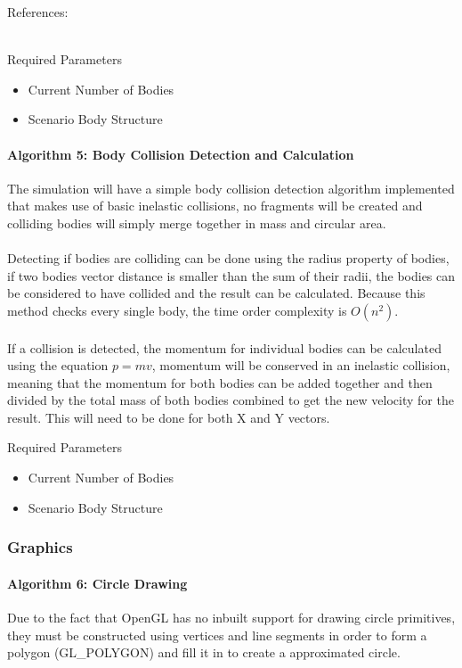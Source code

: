 References: \cite{leapfrog} \\\

Required Parameters
\begin{itemize}
\item Current Number of Bodies
\item Scenario Body Structure
\end{itemize}

\paragraph{Algorithm 5: Body Collision Detection and Calculation}
The simulation will have a simple body collision detection algorithm implemented that makes use of basic inelastic collisions, no fragments will be created and colliding bodies will simply merge together in mass and circular area.

\paragraph{}
Detecting if bodies are colliding can be done using the radius property of bodies, if two bodies vector distance is smaller than the sum of their radii, the bodies can be considered to have collided and the result can be calculated. Because this method checks every single body, the time order complexity is $O(n^2)$.

\paragraph{}
If a collision is detected, the momentum for individual bodies can be calculated using the equation $p=mv$, momentum will be conserved in an inelastic collision, meaning that the momentum for both bodies can be added together and then divided by the total mass of both bodies combined to get the new velocity for the result. This will need to be done for both X and Y vectors.

Required Parameters
\begin{itemize}
\item Current Number of Bodies
\item Scenario Body Structure
\end{itemize}

\pagebreak
\subsubsection{Graphics}
\paragraph{Algorithm 6: Circle Drawing}
Due to the fact that OpenGL has no inbuilt support for drawing circle primitives, they must be constructed using vertices and line segments in order to form a polygon (GL\_POLYGON) and fill it in to create a approximated circle.

